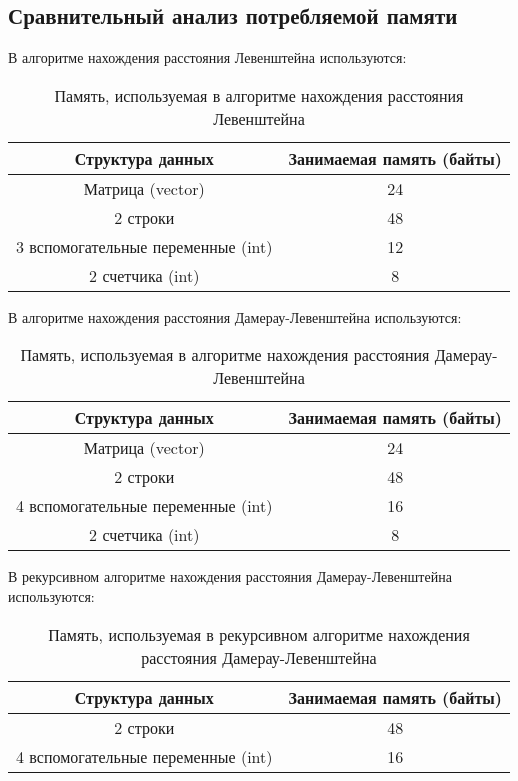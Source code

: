 \documentclass[a4paper, 14pt]{article}
\begin{document}
	\subsection{Сравнительный анализ потребляемой памяти}
	
	В алгоритме нахождения расстояния Левенштейна используются:
	
\begin{table}[H]
\begin{center}
\caption{Память, используемая в алгоритме нахождения расстояния Левенштейна}
	\begin{tabular}{|c|c|}
	\hline 
	Структура данных & Занимаемая память (байты) \\ 
	\hline 
	Матрица (vector) & 24 \\ 
	\hline 
	2 строки & 48 \\ 
	\hline 
	3 вспомогательные переменные (int) & 12 \\ 
	\hline 
	2 счетчика (int) & 8 \\ 
	\hline 
	\end{tabular}
	\end{center}
	\end{table}
	
\newpage	
	В алгоритме нахождения расстояния Дамерау-Левенштейна используются:
	
\begin{table}[H]
\begin{center}
\caption{Память, используемая в алгоритме нахождения расстояния Дамерау-Левенштейна}
	\begin{tabular}{|c|c|}
	\hline 
	Структура данных & Занимаемая память (байты) \\ 
	\hline 
	Матрица (vector) & 24 \\ 
	\hline 
	2 строки & 48 \\ 
	\hline 
	4 вспомогательные переменные (int) & 16 \\ 
	\hline 
	2 счетчика (int) & 8 \\ 
	\hline 
	\end{tabular} 
	\end{center}
	\end{table}

	В рекурсивном алгоритме нахождения расстояния Дамерау-Левенштейна используются:
	
\begin{table}[H]
\begin{center}
\caption{Память, используемая в рекурсивном алгоритме нахождения расстояния Дамерау-Левенштейна}
	\begin{tabular}{|c|c|}
	\hline 
	Структура данных & Занимаемая память (байты) \\ 
	\hline 
	2 строки & 48 \\ 
	\hline 
	4 вспомогательные переменные (int) & 16 \\ 
	\hline 
	\end{tabular} 
	\end{center}
	\end{table}	
\end{document}
